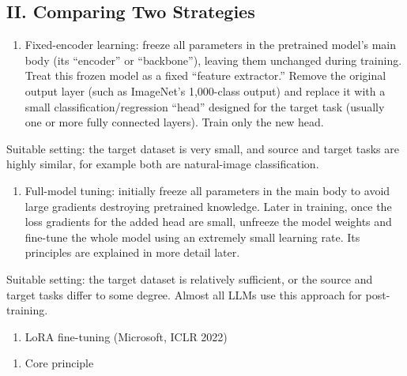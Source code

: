 \hypertarget{ii.-comparing-two-strategies}{%
\subsection{II. Comparing Two Strategies}\label{ii.-comparing-two-strategies}}

\begin{enumerate}
\def\labelenumi{\arabic{enumi}.}
\tightlist
\item
  Fixed-encoder learning: freeze all parameters in the pretrained model's main body (its ``encoder'' or ``backbone''), leaving them unchanged during training. Treat this frozen model as a fixed ``feature extractor.'' Remove the original output layer (such as ImageNet's 1,000-class output) and replace it with a small classification/regression ``head'' designed for the target task (usually one or more fully connected layers). Train only the new head.
\end{enumerate}

Suitable setting: the target dataset is very small, and source and target tasks are highly similar, for example both are natural-image classification.

\begin{enumerate}
\def\labelenumi{\arabic{enumi}.}
\setcounter{enumi}{1}
\tightlist
\item
  Full-model tuning: initially freeze all parameters in the main body to avoid large gradients destroying pretrained knowledge. Later in training, once the loss gradients for the added head are small, unfreeze the model weights and fine-tune the whole model using an extremely small learning rate. Its principles are explained in more detail later.
\end{enumerate}

Suitable setting: the target dataset is relatively sufficient, or the source and target tasks differ to some degree. Almost all LLMs use this approach for post-training.

\begin{enumerate}
\def\labelenumi{\arabic{enumi}.}
\setcounter{enumi}{2}
\tightlist
\item
  LoRA fine-tuning (Microsoft, ICLR 2022)
\end{enumerate}

\begin{enumerate}
\def\labelenumi{(\arabic{enumi})}
\tightlist
\item
  Core principle
\end{enumerate}

